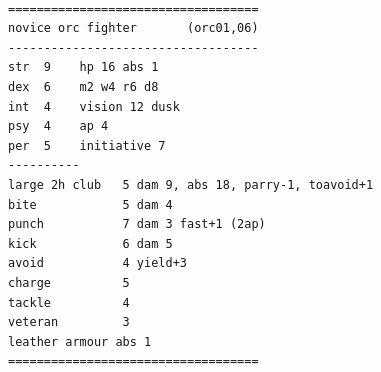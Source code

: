 \

\goodbreak \begin{samepage} \small \begin{verbatim}
===================================
novice orc fighter       (orc01,06)
-----------------------------------
str  9    hp 16 abs 1
dex  6    m2 w4 r6 d8
int  4    vision 12 dusk
psy  4    ap 4
per  5    initiative 7
----------
large 2h club   5 dam 9, abs 18, parry-1, toavoid+1
bite           	5 dam 4
punch          	7 dam 3 fast+1 (2ap)
kick            6 dam 5 
avoid          	4 yield+3
charge         	5
tackle         	4
veteran        	3
leather armour abs 1
===================================
\end{verbatim} \normalsize \end{samepage}












